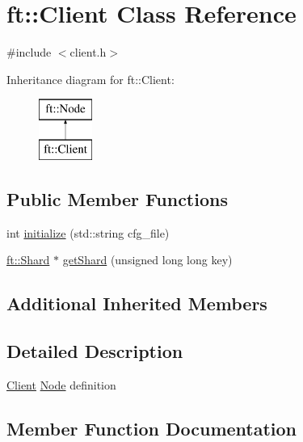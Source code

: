 \hypertarget{classft_1_1Client}{}\section{ft\+:\+:Client Class Reference}
\label{classft_1_1Client}


{\ttfamily \#include $<$client.\+h$>$}

Inheritance diagram for ft\+:\+:Client\+:\begin{figure}[H]
\begin{center}
\leavevmode
\includegraphics[height=2.000000cm]{classft_1_1Client}
\end{center}
\end{figure}
\subsection*{Public Member Functions}
\begin{DoxyCompactItemize}
\item 
int \mbox{\hyperlink{classft_1_1Client_a063db70469c9f2715bbad637d0353680}{initialize}} (std\+::string cfg\+\_\+file)
\item 
\mbox{\hyperlink{classft_1_1Shard}{ft\+::\+Shard}} $\ast$ \mbox{\hyperlink{classft_1_1Client_ac415215bb013b2d9832fe844c5d1c07a}{get\+Shard}} (unsigned long long key)
\end{DoxyCompactItemize}
\subsection*{Additional Inherited Members}


\subsection{Detailed Description}
\mbox{\hyperlink{classft_1_1Client}{Client}} \mbox{\hyperlink{classft_1_1Node}{Node}} definition 

\subsection{Member Function Documentation}
\mbox{\label{classft_1_1Client_ac415215bb013b2d9832fe844c5d1c07a}} 
